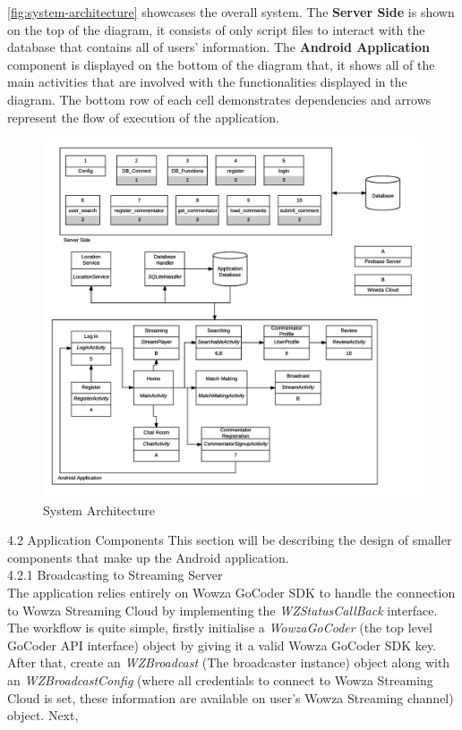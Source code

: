\documentclass{article}
\begin{document}
\begin{flushleft}
\autoref{fig:system-architecture} showcases the overall system. The \textbf{Server Side} is shown on the top of the diagram, it consists of only script files to interact with the database that contains all of users' information. The \textbf{Android Application} component is displayed on the bottom of the diagram that, it shows all of the main activities that are involved with the functionalities displayed in the diagram. The bottom row of each cell demonstrates dependencies and arrows represent the flow of execution of the application.\\
\begin{figure}[!h]
	\centering
	\includegraphics[width=13.5cm]{system-architecture}
	\caption{System Architecture}
	\label{fig:system-architecture}
\end{figure}
{\Large 4.2 Application Components}
This section will be describing the design of smaller components that make up the Android application.\\
{\large 4.2.1 Broadcasting to Streaming Server}\\
The application relies entirely on Wowza GoCoder SDK to handle the connection to Wowza Streaming Cloud by implementing the \textit{WZStatusCallBack} interface. The workflow is quite simple, firstly initialise a \textit{WowzaGoCoder} (the top level GoCoder API interface) object by giving it a valid Wowza GoCoder SDK key. After that, create an \textit{WZBroadcast} (The broadcaster instance) object along with an \textit{WZBroadcastConfig} (where all credentials to connect to Wowza Streaming Cloud is set, these information are available on user's Wowza Streaming channel) object. Next, 

\end{flushleft}
\end{document}

